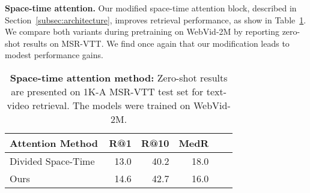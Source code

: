 \documentclass[10pt,twocolumn,letterpaper]{article}
\begin{document}
\noindent\textbf{Space-time attention.} Our modified space-time attention block, described in Section~\ref{subsec:architecture}, improves retrieval performance, as show in Table~\ref{tab:pret_attention}. We compare both variants during pretraining on WebVid-2M by reporting zero-shot results on MSR-VTT. We find once again that our modification leads to modest performance gains.


\begin{table}
\centering
\caption{\textbf{Space-time attention method:} Zero-shot results are presented on 1K-A MSR-VTT test set for text-video retrieval. The models were trained on WebVid-2M.}
\begin{tabular}{lrrrrr}
\toprule
\textbf{Attention Method} & \textbf{R@1} & \textbf{R@10} & \textbf{MedR}    \\
\midrule
Divided Space-Time~\cite{lei2021less} & 13.0    & 40.2      & 18.0  \\
Ours          & 14.6      & 42.7      & 16.0  \\
\bottomrule
\end{tabular}
\label{tab:pret_attention}
\end{table} 
\end{document}
